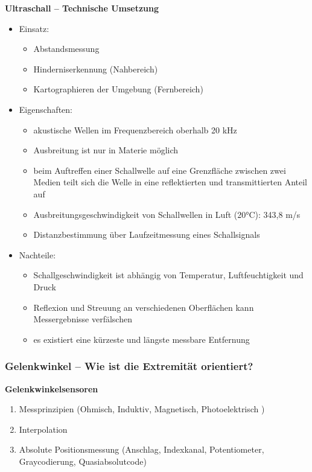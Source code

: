 \textbf{Ultraschall – Technische Umsetzung}
\begin{itemize}
\setlength\itemsep{0em}
\item Einsatz: 
\begin{itemize}
\setlength\itemsep{0em}
\item Abstandsmessung
\item Hinderniserkennung (Nahbereich)
\item Kartographieren der Umgebung (Fernbereich)
\end{itemize}
\item Eigenschaften:
\begin{itemize}
\setlength\itemsep{0em}
\item akustische Wellen im Frequenzbereich oberhalb 20 kHz
\item Ausbreitung ist nur in Materie möglich
\item beim Auftreffen einer Schallwelle auf eine Grenzfläche zwischen zwei Medien teilt sich die Welle in eine reflektierten und transmittierten Anteil auf 
\item Ausbreitungsgeschwindigkeit von Schallwellen in Luft (20°C): 343,8 m/s
\item Distanzbestimmung über Laufzeitmessung eines Schallsignals
\end{itemize}
\item Nachteile:
\begin{itemize}
\setlength\itemsep{0em}
\item Schallgeschwindigkeit ist abhängig von Temperatur, Luftfeuchtigkeit und Druck
\item Reflexion und Streuung an verschiedenen Oberflächen kann Messergebnisse verfälschen
\item es existiert eine kürzeste und längste messbare Entfernung
\end{itemize}
\end{itemize}
\subsubsection{Gelenkwinkel – Wie ist die Extremität orientiert?}
\textbf{Gelenkwinkelsensoren}
\begin{enumerate}
\setlength\itemsep{0em}
\item Messprinzipien (Ohmisch, Induktiv, Magnetisch, Photoelektrisch )
\item Interpolation
\item Absolute Positionsmessung (Anschlag, Indexkanal, Potentiometer, Graycodierung, Quasiabsolutcode)
\end{enumerate}

